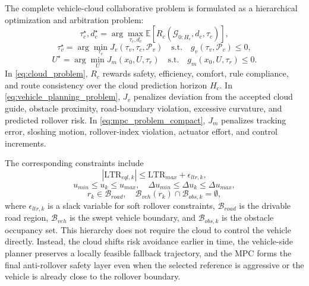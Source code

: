 The complete vehicle-cloud collaborative problem is formulated as a hierarchical optimization and arbitration problem:
\begin{equation}
  \tau_c^\star,d_c^\star
  =\arg\max_{\tau_c,d_c} \mathbb{E}\left[
  R_c(\mathcal{G}_{0:H_c},d_c,\tau_c)
  \right],
  \label{eq:cloud_problem}
\end{equation}
\begin{equation}
  \tau_v^\star
  =\arg\min_{\tau_v}
  J_v(\tau_v,\tau_c,\mathcal{P}_v)
  \quad
  \mathrm{s.t.}\quad
  g_v(\tau_v,\mathcal{P}_v)\leq 0,
  \label{eq:vehicle_planning_problem}
\end{equation}
\begin{equation}
  U^\star
  =\arg\min_{U}
  J_m(x_0,U,\tau_r)
  \quad
  \mathrm{s.t.}\quad
  g_m(x_0,U,\tau_r)\leq 0.
  \label{eq:mpc_problem_compact}
\end{equation}
In \eqref{eq:cloud_problem}, $R_c$ rewards safety, efficiency, comfort, rule compliance, and route consistency over the cloud prediction horizon $H_c$. In \eqref{eq:vehicle_planning_problem}, $J_v$ penalizes deviation from the accepted cloud guide, obstacle proximity, road-boundary violation, excessive curvature, and predicted rollover risk. In \eqref{eq:mpc_problem_compact}, $J_m$ penalizes tracking error, sloshing motion, rollover-index violation, actuator effort, and control increments.

The corresponding constraints include
\begin{equation}
  |\mathrm{LTR}_{eql,k}| \leq \mathrm{LTR}_{max}+\epsilon_{ltr,k},
  \label{eq:ltr_constraint_problem}
\end{equation}
\begin{equation}
  u_{min}\leq u_k\leq u_{max},\quad
  \Delta u_{min}\leq \Delta u_k\leq \Delta u_{max},
  \label{eq:actuator_constraint_problem}
\end{equation}
\begin{equation}
  r_k\in\mathcal{B}_{road},\quad
  \mathcal{B}_{veh}(r_k)\cap\mathcal{B}_{obs,k}=\emptyset,
  \label{eq:road_obstacle_problem}
\end{equation}
where $\epsilon_{ltr,k}$ is a slack variable for soft rollover constraints, $\mathcal{B}_{road}$ is the drivable road region, $\mathcal{B}_{veh}$ is the swept vehicle boundary, and $\mathcal{B}_{obs,k}$ is the obstacle occupancy set. This hierarchy does not require the cloud to control the vehicle directly. Instead, the cloud shifts risk avoidance earlier in time, the vehicle-side planner preserves a locally feasible fallback trajectory, and the MPC forms the final anti-rollover safety layer even when the selected reference is aggressive or the vehicle is already close to the rollover boundary.
